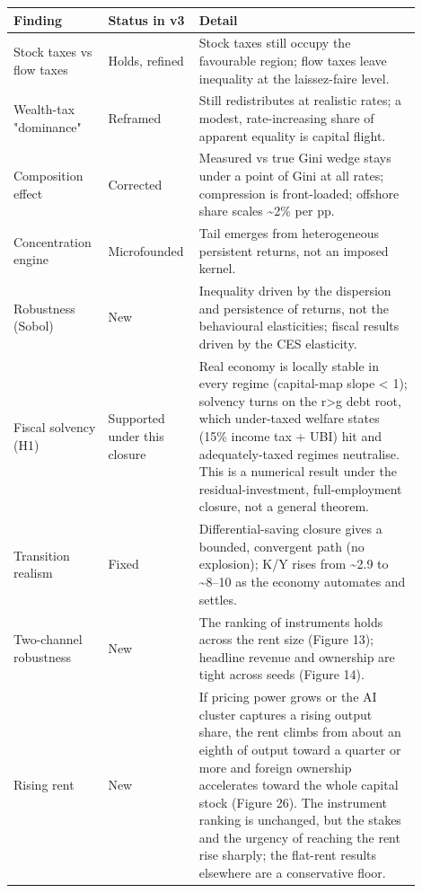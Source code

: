 \documentclass[11pt]{article}
\begin{document}
\begin{longtable}[]{@{}>{\raggedright\arraybackslash}p{0.22\linewidth}>{\raggedright\arraybackslash}p{0.16\linewidth}>{\raggedright\arraybackslash}p{0.52\linewidth}@{}}
\toprule\noalign{}
Finding & Status in v3 & Detail \\
\midrule\noalign{}
\endhead
\bottomrule\noalign{}
\endlastfoot
Stock taxes vs flow taxes & Holds, refined & Stock taxes still occupy
the favourable region; flow taxes leave inequality at the laissez-faire
level. \\
Wealth-tax "dominance" & Reframed & Still redistributes at realistic
rates; a modest, rate-increasing share of apparent equality is capital
flight. \\
Composition effect & Corrected & Measured vs true Gini wedge stays under
a point of Gini at all rates; compression is front-loaded; offshore
share scales \textasciitilde2\% per pp. \\
Concentration engine & Microfounded & Tail emerges from heterogeneous
persistent returns, not an imposed kernel. \\
Robustness (Sobol) & New & Inequality driven by the dispersion and
persistence of returns, not the behavioural elasticities; fiscal results
driven by the CES elasticity. \\
Fiscal solvency (H1) & Supported under this closure & Real economy is
locally stable in every regime (capital-map slope \textless{} 1);
solvency turns on the r\textgreater g debt root, which under-taxed
welfare states (15\% income tax + UBI) hit and adequately-taxed regimes
neutralise. This is a numerical result under the residual-investment,
full-employment closure, not a general theorem. \\
Transition realism & Fixed & Differential-saving closure gives a
bounded, convergent path (no explosion); K/Y rises from
\textasciitilde2.9 to \textasciitilde8--10 as the economy automates and
settles. \\
Two-channel robustness & New & The ranking of instruments holds across
the rent size (Figure 13); headline revenue and ownership are tight
across seeds (Figure 14). \\
Rising rent & New & If pricing power grows or the AI cluster captures a
rising output share, the rent climbs from about an eighth of output
toward a quarter or more and foreign ownership accelerates toward the
whole capital stock (Figure 26). The instrument ranking is unchanged,
but the stakes and the urgency of reaching the rent rise sharply; the
flat-rent results elsewhere are a conservative floor. \\

\end{longtable}
\end{document}
